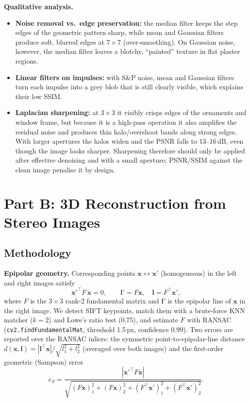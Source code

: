 \documentclass[a4paper,12pt]{article}
\begin{document}
\textbf{Qualitative analysis.}
\begin{itemize}[leftmargin=*]
    \item \textbf{Noise removal vs.\ edge preservation:} the median filter keeps the step edges of the
          geometric pattern sharp, while mean and Gaussian filters produce soft, blurred edges at
          $7\times7$ (over-smoothing). On Gaussian noise, however, the median filter leaves a
          blotchy, ``painted'' texture in flat plaster regions.
    \item \textbf{Linear filters on impulses:} with S\&P noise, mean and Gaussian filters turn each
          impulse into a grey blob that is still clearly visible, which explains their low SSIM.
    \item \textbf{Laplacian sharpening:} at $3\times3$ it visibly crisps edges of the ornaments and
          window frame, but because it is a high-pass operation it also amplifies the residual
          noise and produces thin halo/overshoot bands along strong edges. With larger apertures
          the halos widen and the PSNR falls to 13--16\,dB, even though the image looks sharper.
          Sharpening therefore should only be applied after effective denoising and with a small
          aperture; PSNR/SSIM against the clean image penalise it by design.
\end{itemize}

\section{Part B: 3D Reconstruction from Stereo Images}\label{sec:partb}
\subsection{Methodology}

\textbf{Epipolar geometry.} Corresponding points $\mathbf x \leftrightarrow \mathbf x'$
(homogeneous) in the left and right images satisfy
\begin{equation}
    \mathbf x'^{\top} F\, \mathbf x = 0, \qquad \mathbf l' = F\mathbf x,\quad \mathbf l = F^{\top}\mathbf x',
\end{equation}
where $F$ is the $3\times3$ rank-2 fundamental matrix and $\mathbf l'$ is the epipolar line of
$\mathbf x$ in the right image. We detect SIFT keypoints, match them with a brute-force KNN
matcher ($k=2$) and Lowe's ratio test (0.75), and estimate $F$ with RANSAC
(\texttt{cv2.findFundamentalMat}, threshold 1.5\,px, confidence 0.99). Two errors are reported over
the RANSAC inliers: the symmetric point-to-epipolar-line distance
$d(\mathbf x,\mathbf l)=|\mathbf l^\top\mathbf x|/\sqrt{l_1^2+l_2^2}$ (averaged over both images) and the
first-order geometric (Sampson) error
\begin{equation}
    e_{S} = \frac{|\mathbf x'^{\top}F\mathbf x|}
    {\sqrt{(F\mathbf x)_1^2+(F\mathbf x)_2^2+(F^{\top}\mathbf x')_1^2+(F^{\top}\mathbf x')_2^2}} .
\end{equation}
\end{document}
